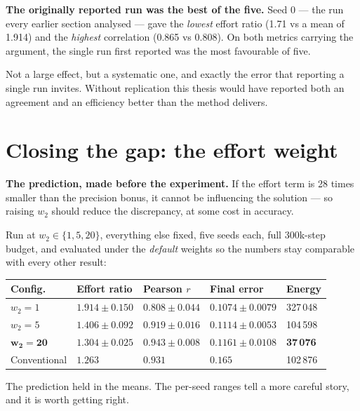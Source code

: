 \begin{trap}
\textbf{The originally reported run was the best of the five.} Seed 0 --- the run
every earlier section analysed --- gave the \emph{lowest} effort ratio (1.71 vs a
mean of 1.914) and the \emph{highest} correlation (0.865 vs 0.808). On both
metrics carrying the argument, the single run first reported was the most
favourable of five.

Not a large effect, but a systematic one, and exactly the error that reporting a
single run invites. Without replication this thesis would have reported both an
agreement and an efficiency better than the method delivers.
\end{trap}

\section{Closing the gap: the effort weight}
\label{sec:sweepresult}

\textbf{The prediction, made before the experiment.} If the effort term is 28
times smaller than the precision bonus, it cannot be influencing the solution ---
so raising $w_2$ should reduce the discrepancy, at some cost in accuracy.

Run at $w_2 \in \{1, 5, 20\}$, everything else fixed, five seeds each, full
300k-step budget, and evaluated under the \emph{default} weights so the numbers
stay comparable with every other result:

\begin{center}
\begin{tabular}{@{} L{2.4cm} C{2.6cm} C{2.4cm} C{2.6cm} C{2.0cm} @{}}
\toprule
\textbf{Config.} & \textbf{Effort ratio} & \textbf{Pearson $r$} & \textbf{Final error} & \textbf{Energy} \\
\midrule
$w_2 = 1$  & $1.914 \pm 0.150$ & $0.808 \pm 0.044$ & $0.1074 \pm 0.0079$ & 327\,048 \\
$w_2 = 5$  & $1.406 \pm 0.092$ & $0.919 \pm 0.016$ & $0.1114 \pm 0.0053$ & 104\,598 \\
$\mathbf{w_2 = 20}$ & $\mathbf{1.304 \pm 0.025}$ & $\mathbf{0.943 \pm 0.008}$ & $0.1161 \pm 0.0108$ & \textbf{37\,076} \\
\midrule
Conventional & $1.263$ & $0.931$ & $0.165$ & 102\,876 \\
\bottomrule
\end{tabular}
\end{center}

The prediction held in the means. The per-seed ranges tell a more careful story,
and it is worth getting right.

